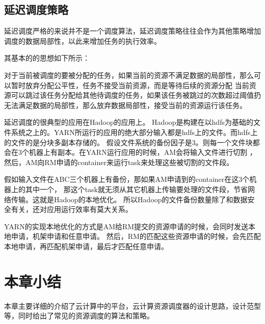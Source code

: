 \subsection{延迟调度策略}
延迟调度严格的来说并不是一个调度算法，延迟调度策略往往会作为其他策略增加调度的数据局部性，以此来增加任务的执行效率。

其基本的的思想如下所示：

对于当前被调度的要被分配的任务，如果当前的资源不满足数据的局部性，那么可以暂时放弃分配公平性，任务不接受当前资源，而是等待后续的资源分配
当前资源可以跳过该任务分配给其他待调度的任务，如果该任务被跳过的次数超过阈值扔无法满足数据的局部性，那么放弃数据局部性，接受当前的资源运行该任务。

延迟调度的很典型的应用在Hadoop的应用上。
Hadoop是构建在以hdfs为基础的文件系统之上的。YARN所运行的应用的绝大部分输入都是hdfs上的文件。而hdfs上的文件的是分块多副本存储的。
假设文件系统的备份因子是3。则每一个文件块都会在3个机器上有副本。在YARN运行应用的时候，AM会将输入文件进行切割
，然后，AM向RM申请的container来运行task来处理这些被切割的文件段。

假如输入文件在ABC三个机器上有备份，那如果AM申请到的container在这3个机器上的其中一个，
那这个task就无须从其它机器上传输要处理的文件段，节省网络传输。这就是Hadoop的本地优化。
所以Hadoop的文件备份数量除了和数据安全有关，还对应用运行效率有莫大关系。

YARN的实现本地优化的方式是AM给RM提交的资源申请的时候，会同时发送本地申请，机架申请和任意申请。
然后，RM的匹配这些资源申请的时候，会先匹配本地申请，再匹配机架申请，最后才匹配任意申请。

\section{本章小结}
本章主要详细的介绍了云计算中的平台，云计算资源调度器的设计思路，设计范型等，同时给出了常见的资源调度的算法和策略。
